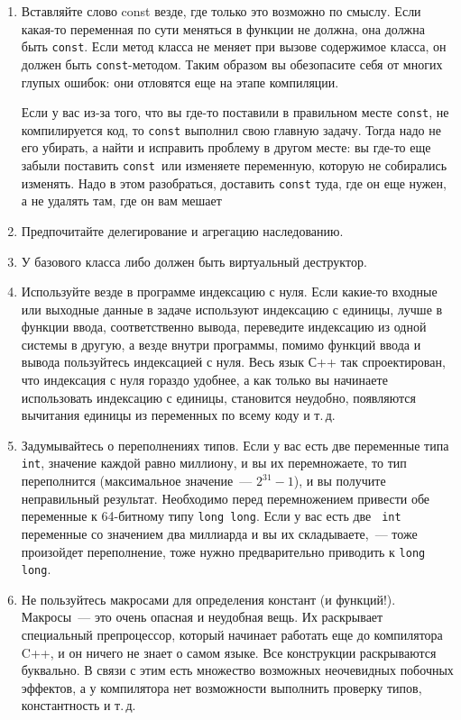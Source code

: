 \documentclass[a4paper,10pt]{article}
\begin{document}
\begin{enumerate}
    \item Вставляйте слово const везде, где только это возможно по смыслу. Если
        какая-то переменная по сути меняться в функции не должна, она должна
        быть {\tt const}. Если метод класса не меняет при вызове содержимое класса, он
        должен быть {\tt const}-методом. Таким образом вы обезопасите себя от многих
        глупых ошибок: они отловятся еще на этапе компиляции.

        Если у вас из-за того, что вы где-то поставили в правильном месте {\tt const},
        не компилируется код, то {\tt const} выполнил свою главную задачу. Тогда надо
        не его убирать, а найти и исправить проблему в другом месте: вы где-то еще
        забыли поставить {\tt const }или изменяете переменную, которую не собирались
        изменять. Надо в этом разобраться, доставить {\tt const} туда, где он еще нужен,
        а не удалять там, где он вам мешает 
        
    \item Предпочитайте делегирование и агрегацию наследованию.
    \item У базового класса либо должен быть виртуальный деструктор.

    \item Используйте везде в программе индексацию с нуля. Если какие-то входные
        или выходные данные в задаче используют индексацию с единицы, лучше
        в функции ввода, соответственно вывода, переведите индексацию из одной
        системы в другую, а везде внутри программы, помимо функций ввода и вывода 
        пользуйтесь индексацией с нуля. Весь язык С++ так спроектирован,
        что индексация с нуля гораздо удобнее, а как только вы начинаете использовать индексацию с единицы, становится неудобно, появляются вычитания
        единицы из переменных по всему коду и т.\,д.

    \item Задумывайтесь о переполнениях типов. Если у вас есть две переменные типа
        {\tt int}, значение каждой равно миллиону, и вы их перемножаете, то тип
        переполнится (максимальное значение~— $2^{31} - 1$), и вы получите
        неправильный результат. Необходимо перед перемножением привести обе
        переменные к 64-битному типу {\tt long long}. Если у вас есть две {\tt
        int} переменные со значением два миллиарда и вы их складываете,~— тоже
        произойдет переполнение, тоже нужно предварительно приводить к {\tt long
        long}.

    \item Не пользуйтесь макросами для определения констант (и функций!). Макросы~— это очень
        опасная и неудобная вещь. Их раскрывает специальный препроцессор, который начинает работать еще до компилятора C++, и он ничего не знает о
        самом языке. Все конструкции раскрываются буквально. В связи с этим есть
        множество возможных неочевидных побочных эффектов, а у компилятора
        нет возможности выполнить проверку типов, константность и т.\,д.


\end{enumerate}
\end{document}
